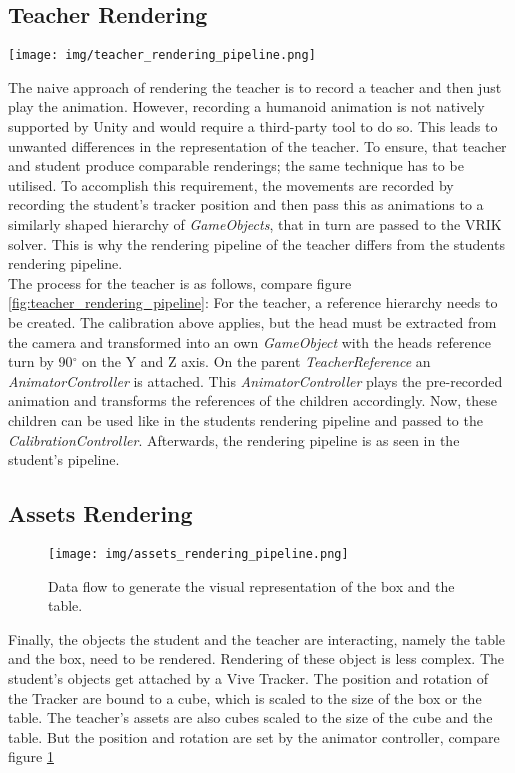 \subsection{Teacher Rendering}
\begin{sidewaysfigure}
	\centering
	\texttt{[image: img/teacher\_rendering\_pipeline.png]}
	\caption{Top: data flow to generate the visual representation of a teacher. Bottom: Example of animating the hip of a teacher.}
	\label{fig:teacher_rendering_pipeline}
\end{sidewaysfigure}
The naive approach of rendering the teacher is to record a teacher and then just play the animation. However, recording a humanoid animation is not natively supported by Unity and would require a third-party tool to do so. This leads to unwanted differences in the representation of the teacher. To ensure, that teacher and student produce comparable renderings; the same technique has to be utilised. To accomplish this requirement, the movements are recorded by recording the student's tracker position and then pass this as animations to a similarly shaped hierarchy of \textit{GameObjects}, that in turn are passed to the VRIK solver. This is why the rendering pipeline of the teacher differs from the students rendering pipeline.\\
The process for the teacher is as follows, compare figure \ref{fig:teacher_rendering_pipeline}:
For the teacher, a reference hierarchy needs to be created. The calibration above applies, but the head must be extracted from the camera and transformed into an own \textit{GameObject} with the heads reference turn by 90$^\circ$ on the Y and Z axis. On the parent \textit{TeacherReference} an \textit{AnimatorController} is attached. This \textit{AnimatorController} plays the pre-recorded animation and transforms the references of the children accordingly. Now, these children can be used like in the students rendering pipeline and passed to the \textit{CalibrationController}. Afterwards, the rendering pipeline is as seen in the student's pipeline.

\subsection{Assets Rendering}
\begin{figure}
	\centering
	\texttt{[image: img/assets\_rendering\_pipeline.png]}
	\caption{Data flow to generate the visual representation of the box and the table.}
	\label{fig:asset_rendering_pipeline}
\end{figure}
Finally, the objects the student and the teacher are interacting, namely the table and the box, need to be rendered. Rendering of these object is less complex. The student's objects get attached by a Vive Tracker. The position and rotation of the Tracker are bound to a cube, which is scaled to the size of the box or the table. The teacher's assets are also cubes scaled to the size of the cube and the table. But the position and rotation are set by the animator controller, compare figure \ref{fig:asset_rendering_pipeline}
